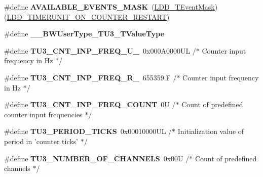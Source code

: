 \begin{DoxyCompactItemize}
\item 
\hypertarget{group___t_u3__module_ga5f04a8830cd52a3ffa1678d113f31aee}{\#define {\bfseries A\-V\-A\-I\-L\-A\-B\-L\-E\-\_\-\-E\-V\-E\-N\-T\-S\-\_\-\-M\-A\-S\-K}~(\hyperlink{group___p_e___types__module_gafbe7f4d4e51560399c3bdd0218584533}{L\-D\-D\-\_\-\-T\-Event\-Mask})(\hyperlink{group___p_e___types__module_gae8e6bf9d76916611a08b76f20ceb1ef7}{L\-D\-D\-\_\-\-T\-I\-M\-E\-R\-U\-N\-I\-T\-\_\-\-O\-N\-\_\-\-C\-O\-U\-N\-T\-E\-R\-\_\-\-R\-E\-S\-T\-A\-R\-T})}\label{group___t_u3__module_ga5f04a8830cd52a3ffa1678d113f31aee}

\item 
\hypertarget{group___t_u3__module_ga5bd26330fbb03de6a8dd32ffcf248521}{\#define {\bfseries \-\_\-\-\_\-\-B\-W\-User\-Type\-\_\-\-T\-U3\-\_\-\-T\-Value\-Type}}\label{group___t_u3__module_ga5bd26330fbb03de6a8dd32ffcf248521}

\item 
\hypertarget{group___t_u3__module_ga668140bcf92816450869c02a705612c9}{\#define {\bfseries T\-U3\-\_\-\-C\-N\-T\-\_\-\-I\-N\-P\-\_\-\-F\-R\-E\-Q\-\_\-\-U\-\_}~0x000\-A0000\-U\-L /$\ast$ Counter input frequency in Hz $\ast$/}\label{group___t_u3__module_ga668140bcf92816450869c02a705612c9}

\item 
\hypertarget{group___t_u3__module_ga3e2a6a9628cf393f63d84d4fcf6b96b0}{\#define {\bfseries T\-U3\-\_\-\-C\-N\-T\-\_\-\-I\-N\-P\-\_\-\-F\-R\-E\-Q\-\_\-\-R\-\_}~655359.\-F /$\ast$ Counter input frequency in Hz $\ast$/}\label{group___t_u3__module_ga3e2a6a9628cf393f63d84d4fcf6b96b0}

\item 
\hypertarget{group___t_u3__module_ga6474373c25d6546fbec2c740e260d5c0}{\#define {\bfseries T\-U3\-\_\-\-C\-N\-T\-\_\-\-I\-N\-P\-\_\-\-F\-R\-E\-Q\-\_\-\-C\-O\-U\-N\-T}~0\-U      /$\ast$ Count of predefined counter input frequencies $\ast$/}\label{group___t_u3__module_ga6474373c25d6546fbec2c740e260d5c0}

\item 
\hypertarget{group___t_u3__module_ga30cc6c289cfa109bfab04af1f34e2214}{\#define {\bfseries T\-U3\-\_\-\-P\-E\-R\-I\-O\-D\-\_\-\-T\-I\-C\-K\-S}~0x00010000\-U\-L /$\ast$ Initialization value of period in 'counter ticks' $\ast$/}\label{group___t_u3__module_ga30cc6c289cfa109bfab04af1f34e2214}

\item 
\hypertarget{group___t_u3__module_ga86a74cd8308d08d7e3bdaf9f75661251}{\#define {\bfseries T\-U3\-\_\-\-N\-U\-M\-B\-E\-R\-\_\-\-O\-F\-\_\-\-C\-H\-A\-N\-N\-E\-L\-S}~0x00\-U   /$\ast$ Count of predefined channels $\ast$/}\label{group___t_u3__module_ga86a74cd8308d08d7e3bdaf9f75661251}


\end{DoxyCompactItemize}
